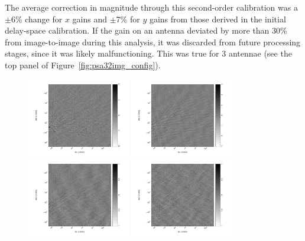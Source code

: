 The average correction in magnitude through this second-order calibration was a $\pm$6\% change for $x$ gains and $\pm$7\% for $y$ gains from those derived in the initial delay-space calibration.
If the gain on an antenna deviated by more than 30\% from image-to-image during this analysis, it was discarded from future processing stages, since it was likely malfunctioning. This was true for 3 antennae (see the top panel of Figure~\ref{fig:psa32img_config}). 

\begin{figure}[h!]
\centering
\includegraphics[width=0.4\textwidth]{chapters/eor_window_PAPER/figures/zen_2455819_50285_orig-I-image.pdf}
\includegraphics[width=0.4\textwidth]{chapters/eor_window_PAPER/figures/zen_2455819_50285_orig-Q-image.pdf}
\includegraphics[width=0.4\textwidth]{chapters/eor_window_PAPER/figures/zen_2455819_50285_orig-U-image.pdf}
\includegraphics[width=0.4\textwidth]{chapters/eor_window_PAPER/figures/zen_2455819_50285_orig-V-image.pdf}

\end{figure}
